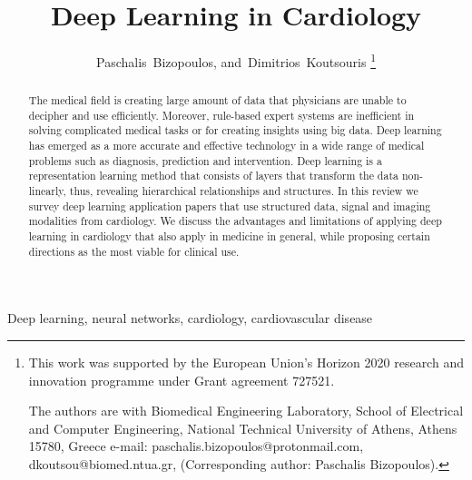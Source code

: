 \documentclass[journal]{IEEEtran}
\begin{document}
\title{Deep Learning in Cardiology}
\author{Paschalis~Bizopoulos, and~Dimitrios~Koutsouris
	\thanks{This work was supported by the European Union's Horizon 2020 research and innovation programme under Grant agreement 727521. 

	The authors are with Biomedical Engineering Laboratory, School of Electrical and Computer Engineering, National Technical University of Athens, Athens 15780, Greece e-mail: paschalis.bizopoulos@protonmail.com, dkoutsou@biomed.ntua.gr, (Corresponding author: Paschalis Bizopoulos).}}

\IEEEoverridecommandlockouts
{}
\maketitle
\IEEEpubidadjcol

\begin{abstract}
	The medical field is creating large amount of data that physicians are unable to decipher and use efficiently.
	Moreover, rule-based expert systems are inefficient in solving complicated medical tasks or for creating insights using big data.
	Deep learning has emerged as a more accurate and effective technology in a wide range of medical problems such as diagnosis, prediction and intervention.
	Deep learning is a representation learning method that consists of layers that transform the data non-linearly, thus, revealing hierarchical relationships and structures.
	In this review we survey deep learning application papers that use structured data, signal and imaging modalities from cardiology.
	We discuss the advantages and limitations of applying deep learning in cardiology that also apply in medicine in general, while proposing certain directions as the most viable for clinical use.
\end{abstract}

\begin{IEEEkeywords}
	Deep learning, neural networks, cardiology, cardiovascular disease
\end{IEEEkeywords}
\end{document}
